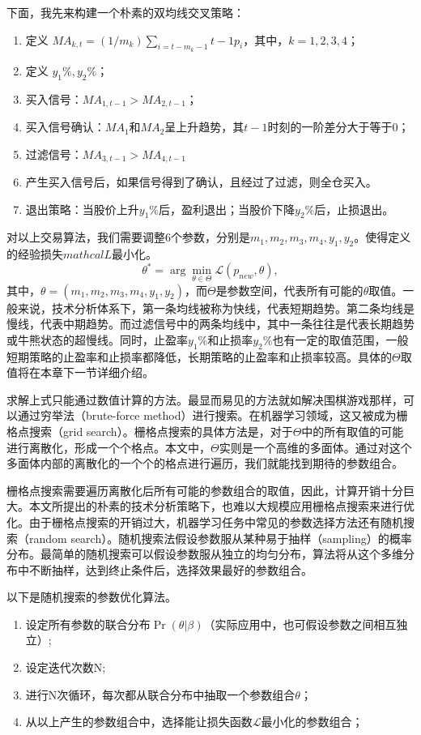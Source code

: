 \documentclass[twoside,longtitle]{LZUthesis}
\begin{document}
下面，我先来构建一个朴素的双均线交叉策略：
\begin{enumerate}
	\item 定义 $MA_{k,t}=(1/m_k)\sum_{i=t-m_k-1}{t-1}p_i $，其中，$k=1,2,3,4$；
	\item 定义 $y_1\%, y_2\%$；
	\item 买入信号：$MA_{1,t-1}>MA_{2,t-1}$；
	\item 买入信号确认：$MA_1$和$MA_2$呈上升趋势，其$t-1$时刻的一阶差分大于等于0；
	\item 过滤信号：$MA_{3,t-1}>MA_{4,t-1}$
	\item 产生买入信号后，如果信号得到了确认，且经过了过滤，则全仓买入。
	\item 退出策略：当股价上升$y_1\%$后，盈利退出；当股价下降$y_2\%$后，止损退出。
\end{enumerate}

对以上交易算法，我们需要调整6个参数，分别是$m_1,m_2,m_3,m_4,y_1,y_2$。使得定义的经验损失$mathcal{L}$最小化。
\begin{equation}
\theta^*=\arg\min_{\theta\in\Theta}\mathcal{L}(p_{new}, \theta),
\end{equation}
其中，$\theta=(m_1,m_2,m_3,m_4,y_1,y_2)$，而$\Theta$是参数空间，代表所有可能的$\theta$取值。一般来说，技术分析体系下，第一条均线被称为快线，代表短期趋势。第二条均线是慢线，代表中期趋势。而过滤信号中的两条均线中，其中一条往往是代表长期趋势或牛熊状态的超慢线。同时，止盈率$y_1\%$和止损率$y_2\%$也有一定的取值范围，一般短期策略的止盈率和止损率都降低，长期策略的止盈率和止损率较高。具体的$\Theta$取值将在本章下一节详细介绍。

求解上式只能通过数值计算的方法。最显而易见的方法就如解决围棋游戏那样，可以通过穷举法（brute-force method）进行搜索。在机器学习领域，这又被成为栅格点搜索（grid search）。栅格点搜索的具体方法是，对于$\Theta$中的所有取值的可能进行离散化，形成一个个格点。本文中，$\Theta$实则是一个高维的多面体。通过对这个多面体内部的离散化的一个个的格点进行遍历，我们就能找到期待的参数组合。

栅格点搜索需要遍历离散化后所有可能的参数组合的取值，因此，计算开销十分巨大。本文所提出的朴素的技术分析策略下，也难以大规模应用栅格点搜索来进行优化。由于栅格点搜索的开销过大，机器学习任务中常见的参数选择方法还有随机搜索（random search）。随机搜索法假设参数服从某种易于抽样（sampling）的概率分布。最简单的随机搜索可以假设参数服从独立的均匀分布，算法将从这个多维分布中不断抽样，达到终止条件后，选择效果最好的参数组合。

以下是随机搜索的参数优化算法\cite{Hastie2004The}。
\begin{enumerate}
	\item 设定所有参数的联合分布$\Pr(\theta|\beta)$（实际应用中，也可假设参数之间相互独立）;
	\item 设定迭代次数N;
	\item 进行N次循环，每次都从联合分布中抽取一个参数组合$\theta$；
	\item 从以上产生的参数组合中，选择能让损失函数$\mathcal{L}$最小化的参数组合；
\end{enumerate}
\end{document}
